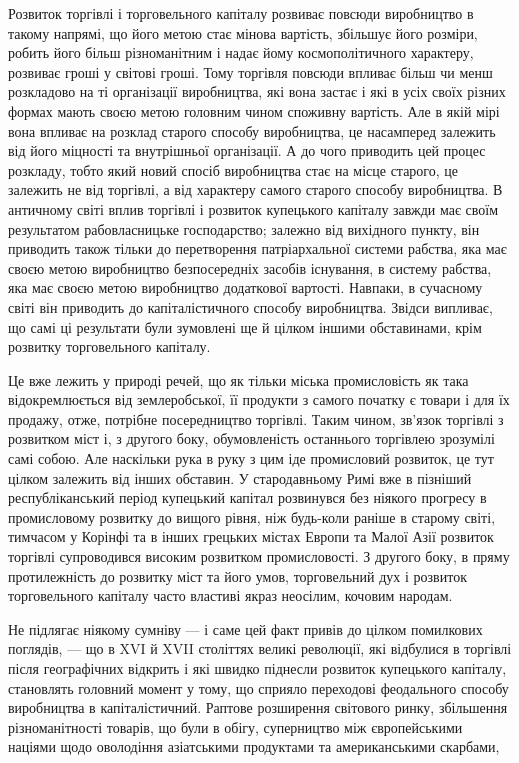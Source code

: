 
Розвиток торгівлі і торговельного капіталу розвиває повсюди
виробництво в такому напрямі, що його метою стає мінова вартість,
збільшує його розміри, робить його більш різноманітним і
надає йому космополітичного характеру, розвиває гроші у світові
гроші. Тому торгівля повсюди впливає більш чи менш розкладово
на ті організації виробництва, які вона застає і які в усіх
своїх різних формах мають своєю метою головним чином споживну
вартість. Але в якій мірі вона впливає на розклад старого
способу виробництва, це насамперед залежить від його
міцності та внутрішньої організації. А до чого приводить цей
процес розкладу, тобто який новий спосіб виробництва стає на
місце старого, це залежить не від торгівлі, а від характеру
самого старого способу виробництва. В античному світі вплив
торгівлі і розвиток купецького капіталу завжди має своїм результатом
рабовласницьке господарство; залежно від вихідного
пункту, він приводить також тільки до перетворення патріархальної
системи рабства, яка має своєю метою виробництво безпосередніх
засобів існування, в систему рабства, яка має своєю
метою виробництво додаткової вартості. Навпаки, в сучасному
світі він приводить до капіталістичного способу виробництва.
Звідси випливає, що самі ці результати були зумовлені ще
й цілком іншими обставинами, крім розвитку торговельного капіталу.

Це вже лежить у природі речей, що як тільки міська промисловість
як така відокремлюється від землеробської, її продукти
з самого початку є товари і для їх продажу, отже, потрібне
посередництво торгівлі. Таким чином, зв’язок торгівлі
з розвитком міст і, з другого боку, обумовленість останнього
торгівлею зрозумілі самі собою. Але наскільки рука в руку
з цим іде промисловий розвиток, це тут цілком залежить від
інших обставин. У стародавньому Римі вже в пізніший республіканський
період купецький капітал розвинувся без ніякого
прогресу в промисловому розвитку до вищого рівня, ніж будь-коли
раніше в старому світі, тимчасом у Корінфі та в інших
грецьких містах Европи та Малої Азії розвиток торгівлі супроводився
високим розвитком промисловості. З другого боку,
в пряму протилежність до розвитку міст та його умов, торговельний
дух і розвиток торговельного капіталу часто властиві
якраз неосілим, кочовим народам.

Не підлягає ніякому сумніву — і саме цей факт привів до
цілком помилкових поглядів, — що в XVI й XVII століттях великі
революції, які відбулися в торгівлі після географічних відкрить
і які швидко піднесли розвиток купецького капіталу,
становлять головний момент у тому, що сприяло переходові
феодального способу виробництва в капіталістичний. Раптове
розширення світового ринку, збільшення різноманітності товарів,
що були в обігу, суперництво між європейськими націями щодо
оволодіння азіатськими продуктами та американськими скарбами,
\parbreak{}  %
